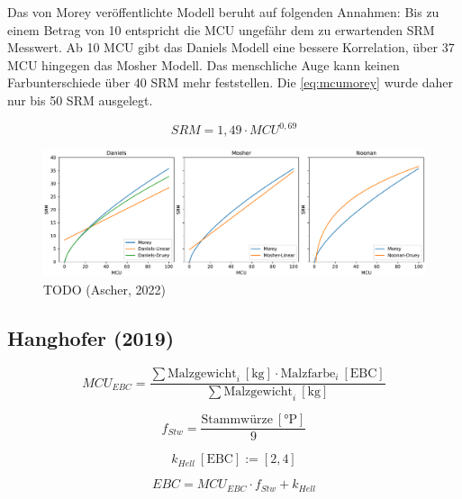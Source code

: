 \documentclass[a4paper,parskip=half]{scrartcl}
\newcommand{\MCUL}{\mathit{MCU}}
\newcommand{\MCUEBC}{\mathit{MCU}_{EBC}}
\newcommand{\EBC}{\mathit{EBC}}
\newcommand{\SRM}{\mathit{SRM}}
\newcommand{\uebc}{\:[\textrm{EBC}]}
\newcommand{\ukg}{\:[\textrm{kg}]}
\newcommand{\uplato}{\:[\textrm{°P}]}
\newcommand{\fstw}{f_{Stw}}
\newcommand{\khell}{k_{Hell}}
\begin{document}
Das von Morey veröffentlichte Modell beruht auf folgenden Annahmen: Bis zu einem Betrag von 10 entspricht die MCU ungefähr dem zu erwartenden SRM Messwert. Ab 10 MCU gibt das Daniels Modell eine bessere Korrelation, über 37 MCU hingegen das Mosher Modell. Das menschliche Auge kann keinen Farbunterschiede über 40 SRM mehr feststellen. Die \autoref{eq:mcumorey} wurde daher nur bis 50 SRM ausgelegt.
\parencite{Morey2004}

\begin{equation}
\SRM = 1,49 \cdot \MCUL^{0,69}
\label{eq:mcumorey}
\end{equation}



\begin{figure}[h]
\centering
\includegraphics[width=14cm]{graph_srm.pdf}
\caption{TODO (Ascher, 2022)}
\label{fig:mcucompare}
\end{figure}

\subsection*{Hanghofer (2019)}

\begin{equation}
\MCUEBC = \frac{\sum \text{Malzgewicht}_i \ukg \cdot \text{Malzfarbe}_i \uebc}{\sum \text{Malzgewicht}_i \ukg} 
\label{eq:mcubasisebc}
\end{equation}

\begin{equation}
\fstw = \frac{\text{Stammwürze} \uplato}{9}
\label{eq:hanghoferfstw}
\end{equation}

\begin{equation}
\khell \uebc := \left[2, 4 \right]
\label{eq:hanghoferhell}
\end{equation}

\begin{equation}
\EBC = \MCUEBC \cdot \fstw + \khell
\label{eq:ebchanghofer}
\end{equation}

\parencite[78]{Hanghofer2019}
\end{document}
